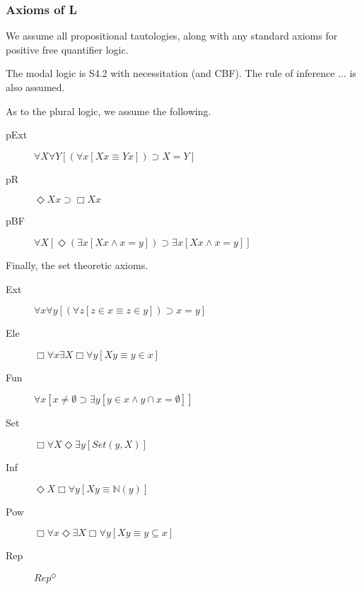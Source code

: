 \documentclass{article}
\begin{document}
\subsubsection{Axioms of L}
We assume all propositional tautologies, along with any standard axioms for positive free quantifier logic.

The modal logic is S4.2 with necessitation (and CBF). The rule of inference ... is also assumed.

As to the plural logic, we assume the following.
\begin{description}
    \item[pExt] $\forall X \forall Y [(\forall x[Xx \equiv Yx]) \supset X = Y]$
    \item[pR] $ \Diamond Xx \supset \Box Xx$
    \item[pBF] $\forall X[ \Diamond (\exists x[Xx \wedge x = y]) \supset \exists x [Xx \wedge x = y]]$
\end{description}
Finally, the set theoretic axioms.
\begin{description}
    \item[Ext] $\forall x \forall y [(\forall z[z \in x \equiv z \in y]) \supset x = y]$
    \item[Ele] $\Box \forall x \exists X \Box \forall y[Xy \equiv y \in x]$
    \item[Fun] $\forall x[ x \not = \emptyset \supset \exists y[y \in x \wedge y \cap x = \emptyset]]$
    \item[Set] $\Box \forall X \Diamond \exists y [Set(y, X)]$
    \item[Inf] $\Diamond X\Box \forall y[Xy \equiv \mathbb{N}(y)]$
    \item[Pow] $\Box \forall x \Diamond \exists X \Box \forall y [Xy \equiv y \subseteq x]$
    \item[Rep] $Rep^\Diamond$
\end{description}
\end{document}
